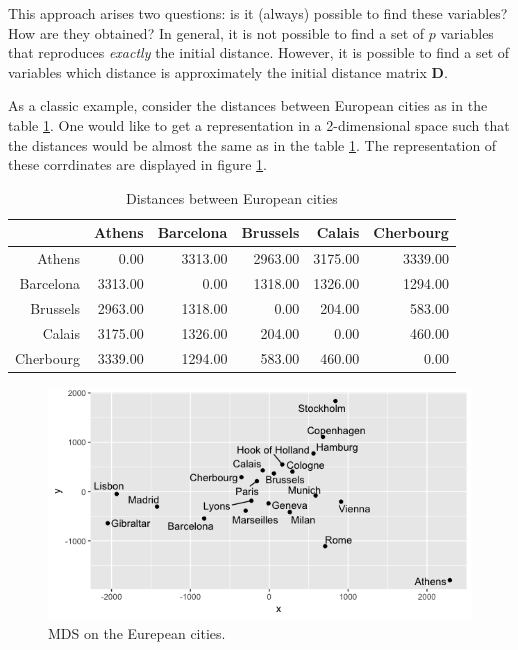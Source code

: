 \documentclass[11pt]{report}
\begin{document}
\indent This approach arises two questions: is it (always) possible to find these
variables? How are they obtained? In general, it is not possible to find a set
of $p$ variables that reproduces \textit{exactly} the initial distance. However, it
is possible to find a set of variables which distance is approximately the initial
distance matrix \textbf{D}.


\indent As a classic example, consider the distances between European cities as
in the table \ref{european_distances}. One would like to get a representation in
a 2-dimensional space such that the distances would be almost the same as in the 
table \ref{european_distances}. The representation of these corrdinates are 
displayed in figure \ref{europ_cities}.

\begin{table}[ht]
\centering
\begin{tabular}{rrrrrr}
  \hline
 & Athens & Barcelona & Brussels & Calais & Cherbourg \\ 
  \hline
Athens & 0.00 & 3313.00 & 2963.00 & 3175.00 & 3339.00 \\ 
  Barcelona & 3313.00 & 0.00 & 1318.00 & 1326.00 & 1294.00 \\ 
  Brussels & 2963.00 & 1318.00 & 0.00 & 204.00 & 583.00 \\ 
  Calais & 3175.00 & 1326.00 & 204.00 & 0.00 & 460.00 \\ 
  Cherbourg & 3339.00 & 1294.00 & 583.00 & 460.00 & 0.00 \\ 
   \hline
\end{tabular}
\caption{Distances between European cities} 
\label{european_distances}
\end{table}
\begin{figure}[ht]
\centering
    \includegraphics[scale = 0.5]{./images/europ_cities.png}
    \caption{MDS on the Eurepean cities.}
    \label{europ_cities}
\end{figure}
\end{document}

